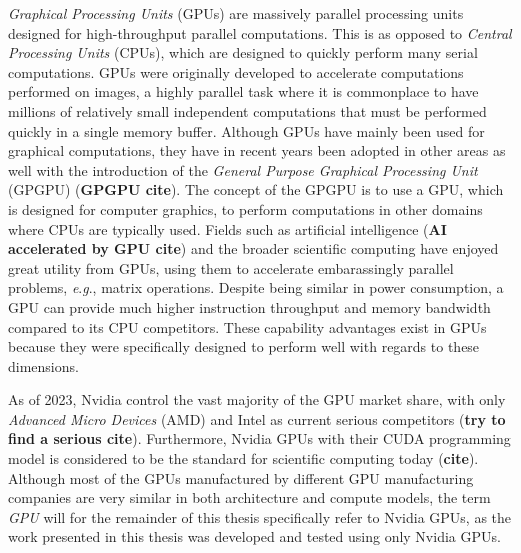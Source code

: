 \textit{Graphical Processing Units} (GPUs) are massively parallel processing units designed for high-throughput parallel computations.
This is as opposed to \textit{Central Processing Units} (CPUs), which are designed to quickly perform many serial computations.
GPUs were originally developed to accelerate computations performed on images, a highly parallel task where it is commonplace to have millions of relatively small independent computations that must be performed quickly in a single memory buffer.
Although GPUs have mainly been used for graphical computations, they have in recent years been adopted in other areas as well with the introduction of the \textit{General Purpose Graphical Processing Unit} (GPGPU) (\textbf{GPGPU cite}). 
The concept of the GPGPU is to use a GPU, which is designed for computer graphics, to perform computations in other domains where CPUs are typically used.
Fields such as artificial intelligence (\textbf{AI accelerated by GPU cite}) and the broader scientific computing have enjoyed great utility from GPUs, using them to accelerate embarassingly parallel problems, \textit{e}.\textit{g}., matrix operations.
Despite being similar in power consumption, a GPU can provide much higher instruction throughput and memory bandwidth compared to its CPU competitors.
These capability advantages exist in GPUs because they were specifically designed to perform well with regards to these dimensions.

As of 2023, Nvidia control the vast majority of the GPU market share, with only \textit{Advanced Micro Devices} (AMD) and Intel as current serious competitors (\textbf{try to find a serious cite}).
Furthermore, Nvidia GPUs with their CUDA programming model is considered to be the standard for scientific computing today (\textbf{cite}).
Although most of the GPUs manufactured by different GPU manufacturing companies are very similar in both architecture and compute models, the term \textit{GPU} will for the remainder of this thesis specifically refer to Nvidia GPUs, as the work presented in this thesis was developed and tested using only Nvidia GPUs.

